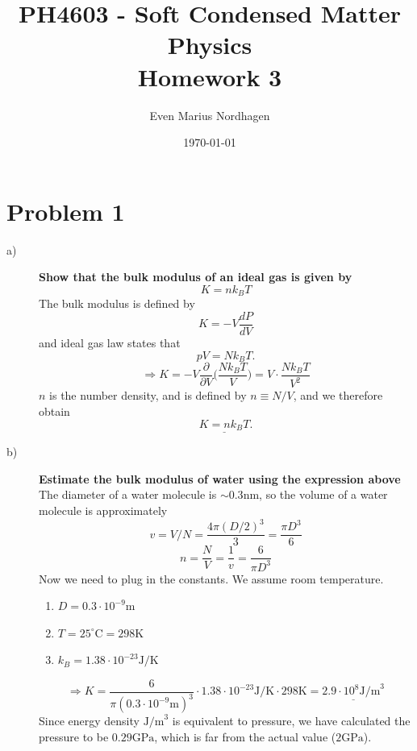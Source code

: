\documentclass[norsk,a4paper,12pt]{article}
\title{PH4603 - Soft Condensed Matter Physics\\\vspace{2mm} \Large{Homework 3}}
\author{\large Even Marius Nordhagen}
\date\today
\begin{document}
\maketitle

\section*{Problem 1}
\begin{description}
\item [a)] \textbf{Show that the bulk modulus of an ideal gas is given by}
\begin{equation}
K=nk_BT
\end{equation}
The bulk modulus is defined by
\begin{equation}
K=-V\frac{dP}{dV}
\end{equation}
and ideal gas law states that
\begin{equation}
pV=Nk_BT.
\end{equation}
$$\Rightarrow K=-V\frac{\partial}{\partial V}\bigg(\frac{Nk_BT}{V}\bigg)=V\cdot\frac{Nk_BT}{V^2}$$
$n$ is the number density, and is defined by $n\equiv N/V$, and we therefore obtain
\begin{equation}
\underline{K=nk_BT}.
\end{equation}
\item [b)] \textbf{Estimate the bulk modulus of water using the expression above}\\
The diameter of a water molecule is $\sim 0.3\text{nm}$, so the volume of a water molecule is approximately
$$v=V/N=\frac{4\pi(D/2)^3}{3}=\frac{\pi D^3}{6}$$
$$n=\frac{N}{V}=\frac{1}{v}=\frac{6}{\pi D^3}$$
Now we need to plug in the constants. We assume room temperature.
\begin{enumerate}
\item $D=0.3\cdot10^{-9}\text{m}$
\item $T=25^\circ\text{C}=298\text{K}$
\item $k_B=1.38\cdot 10^{-23}\text{J/K}$
\end{enumerate}
$$\Rightarrow K=\frac{6}{\pi(0.3\cdot10^{-9}\text{m})^3}\cdot1.38\cdot10^{-23}\text{J/K}\cdot298\text{K}= \underline{2.9\cdot10^8\text{J/m}^3}$$
Since energy density $\text{J/m}^3$ is equivalent to pressure, we have calculated the pressure to be $0.29\text{GPa}$, which is far from the actual value ($2\text{GPa}$). 


\end{description}
\end{document}
